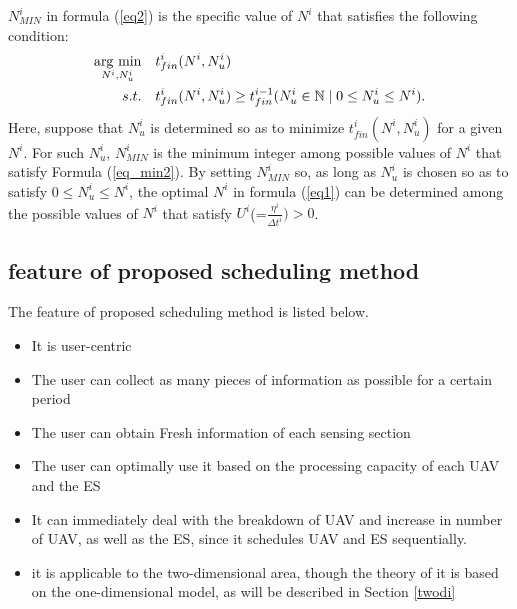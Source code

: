 \documentclass[journal]{IEEEtran}
\newcommand{\argmin}{\mathop{\rm arg~min}\limits}
\begin{document}
$N_{MIN}^i$ in formula (\ref{eq2}) is the specific value of $N^i$ that satisfies the following condition:
%
\begin{align}
\argmin_{N^i,N_u^i} \quad& {t_{fin}^i(N^i,N_u^i)}\label{eq_min1}\\
s.t. \quad& {t_{fin}^i(N^i,N_u^i)}\geq{t_{fin}^{i-1}}({N_u^i}\in \mathbb{N}\mid 0\leq{N_u^i}\leq{N^i}). \label{eq_min2}
\end{align}
%
Here, suppose that ${N_u^i}$ is determined so as to minimize $t_{fin}^i(N^i,N_u^i)$ for a given $N^i$.
%
For such ${N_u^i}$, $N_{MIN}^i$ is the minimum integer among possible values of $N^i$ that satisfy Formula (\ref{eq_min2}).
%
By setting $N_{MIN}^i$ so, as long as ${N_u^i}$ is chosen so as to satisfy $0\leq{N_u^i}\leq{N^i}$, the optimal $N^i$ in formula (\ref{eq1}) can be determined among the possible values of $N^i$ that satisfy $U^i$(=$\frac{\eta^{i}}{{\Delta{t}}^i}) > 0$.

\color{black}
\subsection{feature of proposed scheduling method}
The feature of proposed scheduling method is listed below.
\begin{itemize}
\item It is user-centric 
\item The user can collect as many pieces of information as possible for a certain period
\item The user can obtain Fresh information of each sensing section
\item The user can optimally use it based on the processing capacity of each UAV and the ES
\item It can immediately deal with the breakdown of UAV and increase in number of UAV, as well as the ES, since it schedules UAV and ES sequentially.
\item it is applicable to the two-dimensional area, though the theory of it is based on the one-dimensional model, as will be described in Section \ref{twodi}

\end{itemize}
\end{document}
